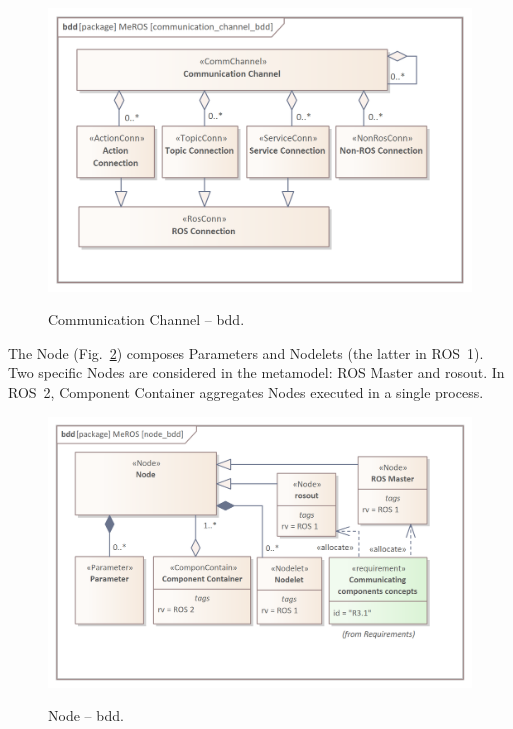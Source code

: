 \documentclass[11pt,oneside,a4paper]{article}
\begin{document}
  
 	\begin{figure}[H]
	 	\centering
	 	\begin{center}
	 		{\includegraphics[scale=0.95]{img/meros_pkg/communication_channel_bdd.png}}
	 	\end{center}
	 	\caption{Communication Channel -- bdd.} 
	 	\label{fig:communication_channel_bdd}
	 \end{figure}
	 
 	The Node (Fig.~\ref{fig:node_bdd}) composes Parameters and Nodelets (the latter in ROS~1). Two specific Nodes are considered in the metamodel: ROS Master and rosout. In ROS~2, Component Container aggregates Nodes executed in a single process.
 	
	 
 	\begin{figure}[H]
	 	\centering
	 	\begin{center}
	 		{\includegraphics[scale=1.0]{img/meros_pkg/node_bdd.png}}
	 	\end{center}
	 	\caption{Node -- bdd.} 
		 	\label{fig:node_bdd}
	 \end{figure}
	 
\end{document}
